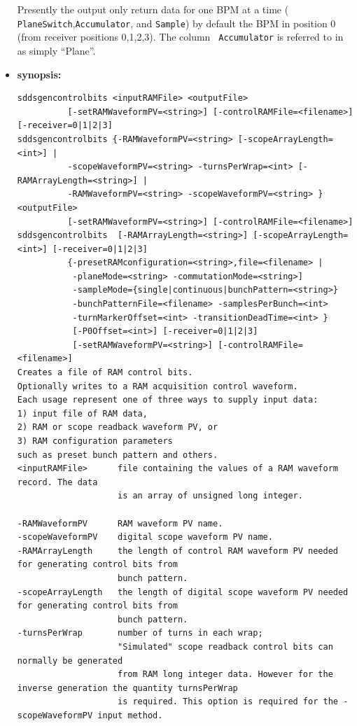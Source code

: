\begin{itemize}
Presently the output only return data for one BPM at a time ({\tt
PlaneSwitch},{\tt Accumulator}, and {\tt Sample}) by default the BPM
in position 0 (from receiver positions 0,1,2,3). The column {\tt
Accumulator} is referred to in \cite{Norum2007} as simply ``Plane''.

\item {\bf synopsis:} 
%
%
\small
\begin{verbatim}
sddsgencontrolbits <inputRAMFile> <outputFile> 
          [-setRAMWaveformPV=<string>] [-controlRAMFile=<filename>] [-receiver=0|1|2|3] 
sddsgencontrolbits {-RAMWaveformPV=<string> [-scopeArrayLength=<int>] | 
          -scopeWaveformPV=<string> -turnsPerWrap=<int> [-RAMArrayLength=<string>] | 
          -RAMWaveformPV=<string> -scopeWaveformPV=<string> } <outputFile> 
          [-setRAMWaveformPV=<string>] [-controlRAMFile=<filename>] 
sddsgencontrolbits  [-RAMArrayLength=<string>] [-scopeArrayLength=<int>] [-receiver=0|1|2|3] 
          {-presetRAMconfiguration=<string>,file=<filename> | 
           -planeMode=<string> -commutationMode=<string>] 
           -sampleMode={single|continuous|bunchPattern=<string>} 
           -bunchPatternFile=<filename> -samplesPerBunch=<int> 
           -turnMarkerOffset=<int> -transitionDeadTime=<int> } 
           [-P0Offset=<int>] [-receiver=0|1|2|3] 
           [-setRAMWaveformPV=<string>] [-controlRAMFile=<filename>] 
Creates a file of RAM control bits.
Optionally writes to a RAM acquisition control waveform.
Each usage represent one of three ways to supply input data:
1) input file of RAM data,
2) RAM or scope readback waveform PV, or
3) RAM configuration parameters 
such as preset bunch pattern and others.
<inputRAMFile>      file containing the values of a RAM waveform record. The data 
                    is an array of unsigned long integer.

-RAMWaveformPV      RAM waveform PV name. 
-scopeWaveformPV    digital scope waveform PV name. 
-RAMArrayLength     the length of control RAM waveform PV needed for generating control bits from 
                    bunch pattern.
-scopeArrayLength   the length of digital scope waveform PV needed for generating control bits from 
                    bunch pattern.
-turnsPerWrap       number of turns in each wrap; 
                    "Simulated" scope readback control bits can normally be generated 
                    from RAM long integer data. However for the inverse generation the quantity turnsPerWrap 
                    is required. This option is required for the -scopeWaveformPV input method.


\end{verbatim}
\end{itemize}
